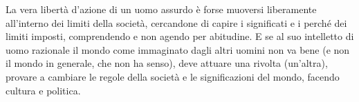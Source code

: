 \documentclass[a4paper,12pt,oneside]{article}%
\begin{document}
La vera libertà d'azione di un uomo assurdo è forse muoversi liberamente all'interno dei limiti della società, cercandone di capire i significati e i perché dei limiti imposti, comprendendo e non agendo per abitudine. E se al suo intelletto di uomo razionale il mondo come immaginato dagli altri uomini non va bene (e non il mondo in generale, che non ha senso), deve attuare una rivolta (un'altra), provare a cambiare le regole della società e le significazioni del mondo, facendo cultura e politica.
	
\end{document}

